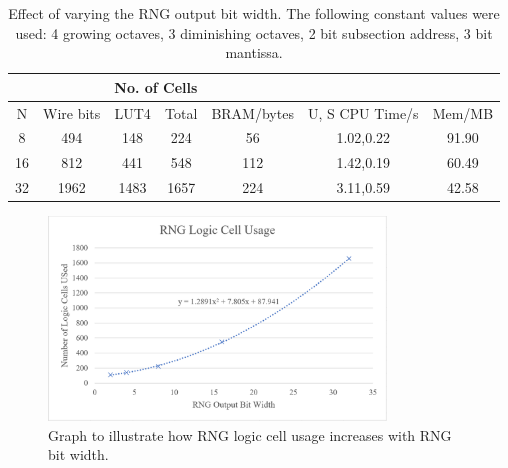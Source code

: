 \documentclass[12pt]{article}
\begin{document}
      \begin{table}[H]
        \centering
        \begin{tabular}{|c||c|c|c|c|c|c|}
          \hline
          &  & \multicolumn{2}{|c|}{No. of Cells} & & &\\
          \hline
          N & Wire bits & LUT4 & Total & BRAM/bytes & U, S CPU Time/s & Mem/MB\\
          \hline
          \hline
          8 & 494 & 148 & 224 & 56 & 1.02,0.22 & 91.90\\
          \hline
          16 & 812 & 441 & 548 & 112 & 1.42,0.19 & 60.49\\
          \hline
          32 & 1962 & 1483 & 1657 & 224 & 3.11,0.59 & 42.58\\
          \hline
        \end{tabular}
        \caption{Effect of varying the RNG output bit width. The following constant values were used: 4 growing octaves, 3 diminishing octaves, 2 bit subsection address, 3 bit mantissa.}
        \label{table:rng_by}
      \end{table}

      \begin{figure}[H]
        \centering
        \includegraphics[width=0.8\textwidth]{fig/rng_graph.png}
        \caption{Graph to illustrate how RNG logic cell usage increases with RNG bit width.}
        \label{fig:rng_graph}
      \end{figure}
\end{document}
